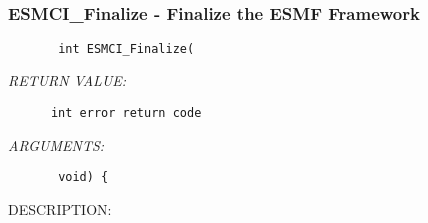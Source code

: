 \mbox{}\hrulefill\ 
 
\subsubsection [ESMCI\_Finalize] {ESMCI\_Finalize - Finalize the ESMF Framework}


  
\begin{verbatim}       int ESMCI_Finalize(\end{verbatim}{\em RETURN VALUE:}
\begin{verbatim}      int error return code\end{verbatim}{\em ARGUMENTS:}
\begin{verbatim}       void) {\end{verbatim}
{\sf DESCRIPTION:\\ }


  
\setlength{\parskip}{\oldparskip}
\setlength{\parindent}{\oldparindent}
\setlength{\baselineskip}{\oldbaselineskip}

